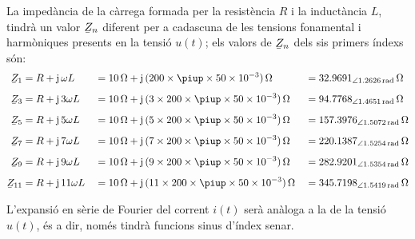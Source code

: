 \begin{exemple}
    La impedància de la càrrega formada per la resistència $R$ i la
    inductància $L$, tindrà un valor $\cmplx{Z}_n$ diferent per a
    cadascuna de les tensions fonamental i harmòniques presents en la
    tensió $u(t)$; els valors de $\cmplx{Z}_n$ dels sis primers índexs són:
    \begin{alignat*}{3}
        \cmplx{Z}_1 &= R + \ju\, \omega L &&= \SI{10}{\ohm} + \ju\, (200\times \piup\times 50\times 10^{-3})\si{\,\ohm} &&=
        \SIpr{32,9691}{1,2626}{\ohm}\\[1ex]
        \cmplx{Z}_3 &= R + \ju\, 3 \omega L &&= \SI{10}{\ohm} + \ju\, (3\times 200\times \piup\times 50\times 10^{-3})\si{\,\ohm} &&=
        \SIpr{94,7768}{1,4651}{\ohm}\\[1ex]
        \cmplx{Z}_5 &= R + \ju\, 5 \omega L &&= \SI{10}{\ohm} + \ju\, (5\times 200\times \piup\times 50\times 10^{-3})\si{\,\ohm} &&=
        \SIpr{157,3976}{1,5072}{\ohm}\\[1ex]
        \cmplx{Z}_7 &= R + \ju\, 7 \omega L &&= \SI{10}{\ohm} + \ju\, (7\times 200\times \piup\times 50\times 10^{-3})\si{\,\ohm} &&=
        \SIpr{220,1387}{1,5254}{\ohm}\\[1ex]
        \cmplx{Z}_9 &= R + \ju\, 9 \omega L &&= \SI{10}{\ohm} + \ju\, (9\times 200\times \piup\times 50\times 10^{-3})\si{\,\ohm} &&=
        \SIpr{282,9201}{1,5354}{\ohm}\\[1ex]
        \cmplx{Z}_{11} &= R + \ju\, 11 \omega L &&= \SI{10}{\ohm} + \ju\, (11\times 200\times \piup\times 50\times 10^{-3})\si{\,\ohm} &&=
        \SIpr{345,7198}{1,5419}{\ohm}
    \end{alignat*}

    L'expansió en sèrie de Fourier del corrent $i(t)$ serà anàloga a la
    de la tensió $u(t)$, és a dir, només tindrà funcions sinus
    d'índex senar.


\end{exemple}
